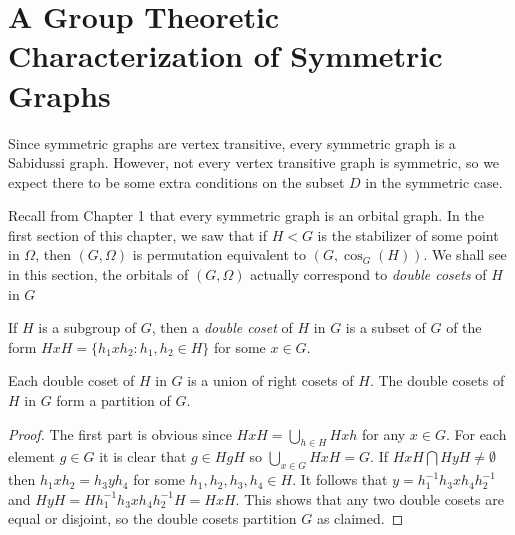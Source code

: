 \section{A Group Theoretic Characterization of Symmetric Graphs}

Since symmetric graphs are vertex transitive,
every symmetric graph is a Sabidussi graph.
However, not every vertex transitive graph is symmetric,
so we expect there to be some extra conditions on
the subset $D$ in the symmetric case.

Recall from Chapter 1 that every symmetric graph 
is an orbital graph.
In the first section of this chapter, we saw that if $H < G$
is the stabilizer of some point in $\Omega$, then $(G,\Omega)$
is permutation equivalent to $(G,\cos_G(H))$.
We shall see in this section, the orbitals of $(G,\Omega)$
actually correspond to {\it double cosets} of $H$ in $G$

\begin{definition}
If $H$ is a subgroup of $G$, then a {\it double coset} of $H$ in $G$
is a subset of $G$ of the form
$HxH = \{ h_1 x h_2 : h_1, h_2 \in H \}$
for some $x \in G$.
\end{definition}

\begin{lemma} 
Each double coset of $H$ in $G$ is a union of right cosets of $H$.
The double cosets of $H$ in $G$ form a partition of $G$.
\begin{proof}
The first part is obvious since $HxH = \bigcup_{h \in H} Hxh$
for any $x \in G$.
For each element $g \in G$ it is clear that $g \in HgH$
so $\bigcup_{x \in G} HxH = G$.
If $HxH \bigcap HyH \neq \emptyset$ 
then $h_1 x h_2 = h_3 y h_4 $ for some $h_1,h_2,h_3,h_4 \in H$.
It follows that $y = h_1^{-1} h_3 x h_4 h_2^{-1}$ 
and $HyH = H h_1^{-1} h_3 x h_4 h_2^{-1} H = HxH$.
This shows that any two double cosets are equal or disjoint,
so the double cosets partition $G$ as claimed.
\end{proof}
\end{lemma}

